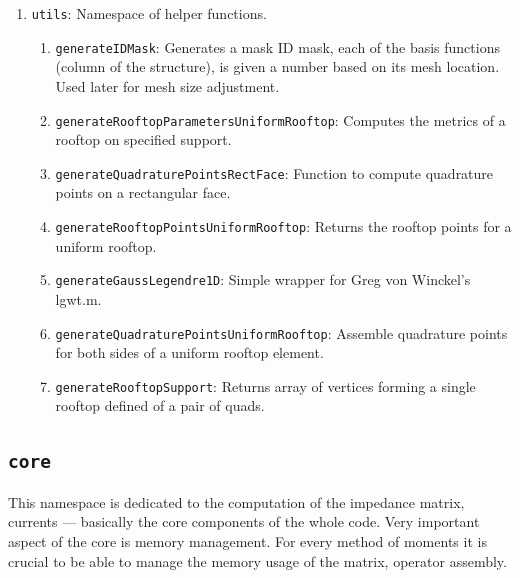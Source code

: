 \documentclass[9pt]{article}
\begin{document}
\begin{enumerate}[label=\Roman*.]
\begin{enumerate}[label=\roman*.]
            \item \texttt{order}: Gives the quadrature order.
            \item \texttt{generate}: Generates the weights and points for two unit squares.
            \item \texttt{weigths4D}: Obtain the weights for 4D integration.
            \item \texttt{weigths2D}: Obtain the weights for 2D integration.
            \item \texttt{points}: Returns pair of points, each one for one rectangle.
        \end{enumerate}
        \item \texttt{utils}: Namespace of helper functions.
        \begin{enumerate}[label=\roman*.]
            \item \texttt{generateIDMask}: Generates a mask ID mask, each of the basis functions (column of the structure), is given a number based on its mesh location. Used later for mesh size adjustment.
            \item \texttt{generateRooftopParametersUniformRooftop}: Computes the metrics of a rooftop on specified support.
            \item \texttt{generateQuadraturePointsRectFace}: Function to compute quadrature points on a rectangular face.
            \item \texttt{generateRooftopPointsUniformRooftop}: Returns the rooftop points for a uniform rooftop.
            \item \texttt{generateGaussLegendre1D}: Simple wrapper for Greg von Winckel’s lgwt.m.
            \item \texttt{generateQuadraturePointsUniformRooftop}: Assemble quadrature points for both sides of a uniform rooftop element.
            \item \texttt{generateRooftopSupport}: Returns array of vertices forming a single rooftop defined of a pair of quads.
        \end{enumerate}
    \end{enumerate}

    \subsection{\texttt{core}}

    This namespace is dedicated to the computation of the impedance matrix, currents --- basically the core components of the whole code. Very important aspect of the core is memory management. For every method of moments it is crucial to be able to manage the memory usage of the matrix, operator assembly.
\end{document}
